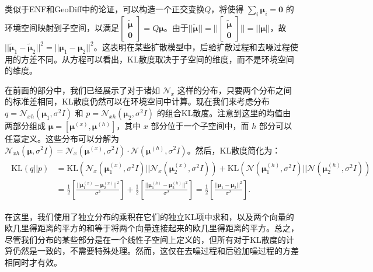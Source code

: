类似于ENF和GeoDiff\cite{enf_satorras_21, geodiff_xu_22}中的论证，可以构造一个正交变换$Q$，将使得 $\sum_i \mathbf{\mu}_i = \mathbf{0}$ 的环境空间映射到子空间，以满足$\begin{bmatrix} \tilde{\mathbf{\mu}} \\ \mathbf{0} \end{bmatrix} = Q \mathbf{\mu}$。由于$||\tilde{\mathbf{\mu}}|| = ||\begin{bmatrix} \tilde{\mathbf{\mu}} \\ \mathbf{0} \end{bmatrix}|| = ||\mathbf{\mu}||$，故$||\tilde{\mathbf{\mu}}_1 - \tilde{\mathbf{\mu}}_2||^2 = ||\mathbf{\mu}_1 - \mathbf{\mu}_2||^2$。这表明在某些扩散模型中，后验扩散过程和去噪过程使用的方差不同。从方程可以看出，KL散度取决于子空间的维度，而不是环境空间的维度。

在前面的部分中，我们已经展示了对于诸如 $\mathcal{N}_x$ 这样的分布，只要两个分布之间的标准差相同，KL散度仍然可以在环境空间中计算。现在我们来考虑分布 $q = \mathcal{N}_{xh}(\mathbf{\mu}_1, \sigma^2 I)$ 和 $p = \mathcal{N}_{xh}(\mathbf{\mu}_2, \sigma^2 I)$ 的组合KL散度。注意到这里的均值由两部分组成 $\mathbf{\mu} = [\mathbf{\mu}^{(x)}, \mathbf{\mu}^{(h)}]$，其中 $x$ 部分位于一个子空间中，而 $h$ 部分可以任意定义。这些分布可以分解为 $\mathcal{N}_{xh}(\mathbf{\mu}, \sigma^2 I) = \mathcal{N}_{x}(\mathbf{\mu}^{(x)}, \sigma^2 I) \cdot \mathcal{N}(\mathbf{\mu}^{(h)}, \sigma^2 I)$。然后，KL散度简化为：
\begin{align}
    \begin{split}
        \mathrm{KL}(q||p) &= \mathrm{KL}\left(\mathcal{N}_{x}(\mathbf{\mu}_1^{(x)}, \sigma^2 I) || \mathcal{N}_{x}(\mathbf{\mu}_2^{(x)}, \sigma^2 I)\right) + \mathrm{KL}\left(\mathcal{N}(\mathbf{\mu}_1^{(h)}, \sigma^2 I) || \mathcal{N}(\mathbf{\mu}_2^{(h)}, \sigma^2 I )\right) \\
        &= \frac{1}{2} \left[ \frac{||\mathbf{\mu}_1^{(x)} - \mathbf{\mu}_2^{(x)}||^2}{\sigma^2} \right] + \frac{1}{2} \left[ \frac{||\mathbf{\mu}_1^{(h)} - \mathbf{\mu}_2^{(h)}||^2}{\sigma^2} \right] = \frac{1}{2} \left[ \frac{||\mathbf{\mu}_1 - \mathbf{\mu}_2||^2}{\sigma^2} \right].
    \end{split}
\end{align}

在这里，我们使用了独立分布的乘积在它们的独立KL项中求和，以及两个向量的欧几里得距离的平方的和等于将两个向量连接起来的欧几里得距离的平方。总之，尽管我们分布的某些部分是在一个线性子空间上定义的，但所有对于KL散度的计算仍然是一致的，不需要特殊处理。然而，这仅在去噪过程和后验加噪过程的方差相同时才有效。
